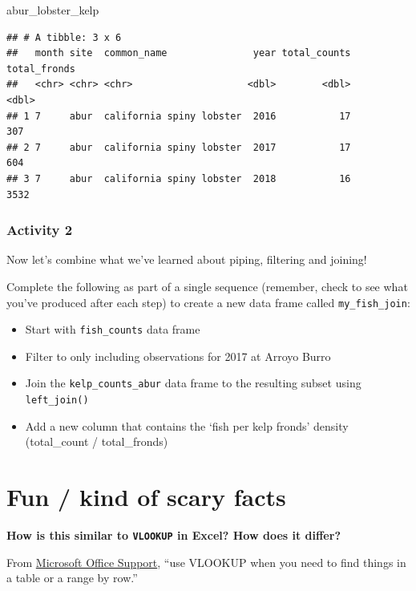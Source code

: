 \documentclass[]{book}
\newenvironment{Shaded}{\begin{snugshade}}{\end{snugshade}}
\newcommand{\NormalTok}[1]{#1}
\providecommand{\tightlist}{%
  \setlength{\itemsep}{0pt}\setlength{\parskip}{0pt}}
\begin{document}
\begin{Shaded}
\begin{Highlighting}[]
\NormalTok{abur_lobster_kelp}
\end{Highlighting}
\end{Shaded}

\begin{verbatim}
## # A tibble: 3 x 6
##   month site  common_name               year total_counts total_fronds
##   <chr> <chr> <chr>                    <dbl>        <dbl>        <dbl>
## 1 7     abur  california spiny lobster  2016           17          307
## 2 7     abur  california spiny lobster  2017           17          604
## 3 7     abur  california spiny lobster  2018           16         3532
\end{verbatim}

\hypertarget{activity-2-1}{%
\subsubsection{Activity 2}\label{activity-2-1}}

Now let's combine what we've learned about piping, filtering and joining!

Complete the following as part of a single sequence (remember, check to see what you've produced after each step) to create a new data frame called \texttt{my\_fish\_join}:

\begin{itemize}
\tightlist
\item
  Start with \texttt{fish\_counts} data frame
\item
  Filter to only including observations for 2017 at Arroyo Burro
\item
  Join the \texttt{kelp\_counts\_abur} data frame to the resulting subset using \texttt{left\_join()}
\item
  Add a new column that contains the `fish per kelp fronds' density (total\_count / total\_fronds)
\end{itemize}

\hypertarget{fun-kind-of-scary-facts}{%
\section{Fun / kind of scary facts}\label{fun-kind-of-scary-facts}}

\textbf{How is this similar to \texttt{VLOOKUP} in Excel? How does it differ?}

From \href{https://support.office.com/en-us/article/vlookup-function-0bbc8083-26fe-4963-8ab8-93a18ad188a1}{Microsoft Office Support}, ``use VLOOKUP when you need to find things in a table or a range by row.''
\end{document}
